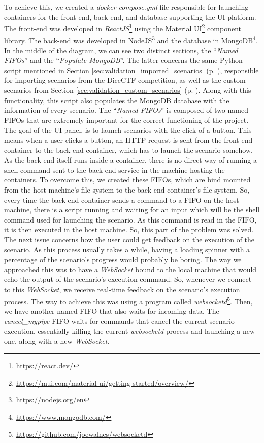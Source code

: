 To achieve this, we created a \textit{docker-compose.yml} file responsible for launching containers for the front-end, back-end, and database supporting the UI platform. The front-end was developed in \textit{ReactJS}\footnote{\url{https://react.dev/}} using the Material UI\footnote{\url{https://mui.com/material-ui/getting-started/overview/}} component library. The back-end was developed in NodeJS\footnote{\url{https://nodejs.org/en}} and the database in MongoDB\footnote{\url{https://www.mongodb.com/}}. In the middle of the diagram, we can see two distinct sections, the ``\textit{Named FIFOs}'' and the ``\textit{Populate MongoDB}''. The latter concerns the same Python script mentioned in Section \ref{sec:validation_imported_scenarios} (p. \pageref{sec:validation_imported_scenarios}), responsible for importing scenarios from the DiceCTF competition, as well as the custom scenarios from Section \ref{sec:validation_custom_scenarios} (p. \pageref{sec:validation_custom_scenarios}).
Along with this functionality, this script also populates the MongoDB database with the information of every scenario. The ``\textit{Named FIFOs}'' is composed of two named FIFOs that are extremely important for the correct functioning of the project. The goal of the UI panel, is to launch scenarios with the click of a button. This means when a user clicks a button, an HTTP request is sent from the front-end container to the back-end container, which has to launch the scenario somehow. As the back-end itself runs inside a container, there is no direct way of running a shell command sent to the back-end service in the machine hosting the containers. To overcome this, we created these FIFOs, which are bind mounted from the host machine's file system to the back-end container's file system. So, every time the back-end container sends a command to a FIFO on the host machine, there is a script running and waiting for an input which will be the shell command used for launching the scenario. As this command is read in the FIFO, it is then executed in the host machine. So, this part of the problem was solved. The next issue concerns how the user could get feedback on the execution of the scenario. As this process usually takes a while, having a loading spinner with a percentage of the scenario's progress would probably be boring.
The way we approached this was to have a \textit{WebSocket} bound to the local machine that would echo the output of the scenario's execution command. So, whenever we connect to this \textit{WebSocket}, we receive real-time feedback on the scenario's execution process. The way to achieve this was using a program called \textit{websocketd}\footnote{\url{https://github.com/joewalnes/websocketd}}. Then, we have another named FIFO that also waits for incoming data. The \textit{cancel\_mypipe} FIFO waits for commands that cancel the current scenario execution, essentially killing the current \textit{websocketd} process and launching a new one, along with a new \textit{WebSocket}.

